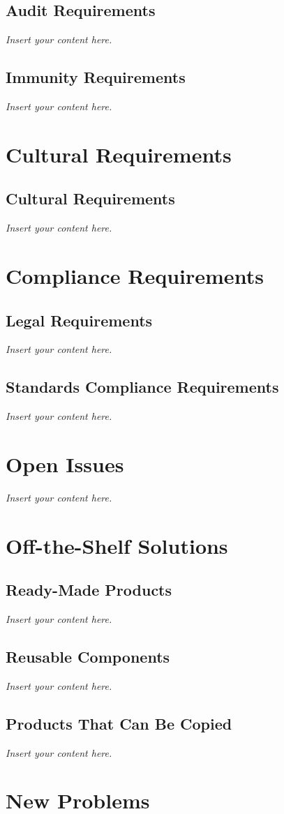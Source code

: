 \documentclass[12pt]{article}
\newcommand{\lips}{\textit{Insert your content here.}}
\begin{document}
\subsection{Audit Requirements}
\lips
\subsection{Immunity Requirements}
\lips

\section{Cultural Requirements}
\subsection{Cultural Requirements}
\lips

\section{Compliance Requirements}
\subsection{Legal Requirements}
\lips
\subsection{Standards Compliance Requirements}
\lips

\section{Open Issues}
\lips

\section{Off-the-Shelf Solutions}
\subsection{Ready-Made Products}
\lips
\subsection{Reusable Components}
\lips
\subsection{Products That Can Be Copied}
\lips

\section{New Problems}
\end{document}
